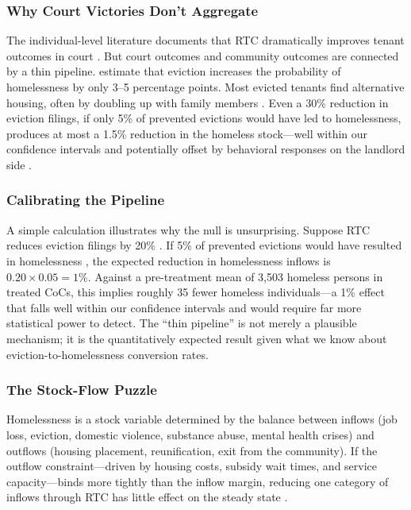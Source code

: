 \documentclass[12pt]{article}
\begin{document}
\subsubsection*{Why Court Victories Don't Aggregate} The individual-level literature documents that RTC dramatically improves tenant outcomes in court \citep{cassidy2022, caspi2025, seron2001}. But court outcomes and community outcomes are connected by a thin pipeline. \citet{humphries2019} estimate that eviction increases the probability of homelessness by only 3--5 percentage points. Most evicted tenants find alternative housing, often by doubling up with family members \citep{desmond2016}. Even a 30\% reduction in eviction filings, if only 5\% of prevented evictions would have led to homelessness, produces at most a 1.5\% reduction in the homeless stock---well within our confidence intervals and potentially offset by behavioral responses on the landlord side \citep{gromis2022}.

\subsubsection*{Calibrating the Pipeline} A simple calculation illustrates why the null is unsurprising. Suppose RTC reduces eviction filings by 20\% \citep{cassidy2022}. If 5\% of prevented evictions would have resulted in homelessness \citep{humphries2019}, the expected reduction in homelessness inflows is $0.20 \times 0.05 = 1\%$. Against a pre-treatment mean of 3,503 homeless persons in treated CoCs, this implies roughly 35 fewer homeless individuals---a 1\% effect that falls well within our confidence intervals and would require far more statistical power to detect. The ``thin pipeline'' is not merely a plausible mechanism; it is the quantitatively expected result given what we know about eviction-to-homelessness conversion rates.

\subsubsection*{The Stock-Flow Puzzle} Homelessness is a stock variable determined by the balance between inflows (job loss, eviction, domestic violence, substance abuse, mental health crises) and outflows (housing placement, reunification, exit from the community). If the outflow constraint---driven by housing costs, subsidy wait times, and service capacity---binds more tightly than the inflow margin, reducing one category of inflows through RTC has little effect on the steady state \citep{obrien2020, corinth2017}.
\end{document}
